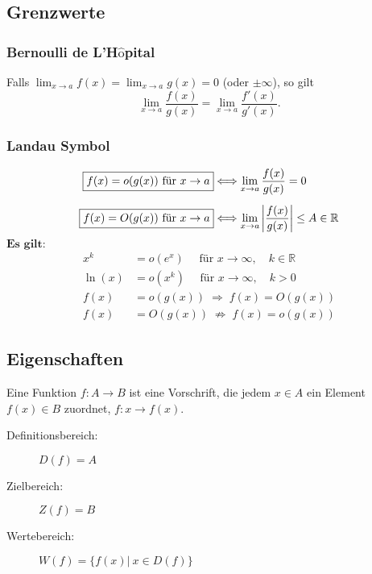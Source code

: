 \subsection{Grenzwerte}
    \subsubsection{Bernoulli de L'H$\hat{\textrm{o}}$pital}
        Falls $\displaystyle \lim_{x \to a} f(x) = \lim_{x \to a} g(x) = 0$ (oder $\pm \infty$), so gilt
        $$
            \lim_{x \to a} \frac{f(x)}{g(x)} = \lim_{x \to a} \frac{f'(x)}{g'(x)}.
        $$
    \subsubsection{Landau Symbol}
        \vspace{-1em}
        \begin{align*}
            \fbox{$f(x) = o(g(x)) \textrm{ für } x \to a$} &\Longleftrightarrow \lim_{x \to a} \frac{f(x)}{g(x)} = 0\\[0.5em]
            \fbox{$f(x) = O(g(x)) \textrm{ für } x \to a$}  &\Longleftrightarrow \lim_{x \to a} \left\lvert\frac{f(x)}{g(x)}\right\rvert \leq A \in \mathbb{R}
        \end{align*}
        $\textbf{Es gilt:}$
            \begin{align*}
                x^k &= o(e^x) \quad \textrm{ für } x \to \infty, \quad k \in \mathbb{R}\\
                \ln(x) &= o(x^k) \quad \textrm{ für } x \to \infty, \quad k > 0\\[0.5em]
                f(x) &= o(g(x)) \; \Rightarrow \; f(x) = O(g(x))\\
                f(x) &= O(g(x)) \; \nRightarrow \; f(x) = o(g(x))
            \end{align*}
    \subsection{Eigenschaften}
        Eine Funktion $f : A \to B$ ist eine Vorschrift, die jedem $x \in A$ ein Element $f(x) \in B$ zuordnet, $f: x \to f(x)$.
        \begin{description}
            \item[Definitionsbereich:] $D(f) = A$
            \item[Zielbereich:] $Z(f) = B$
            \item[Wertebereich:] $W(f) = \{ f(x) \vert \ x \in D(f)\}$   
        \end{description}
